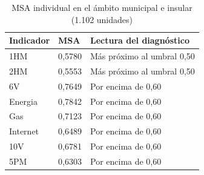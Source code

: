 \begin{table}[htbp]
\centering\small
\caption{MSA individual en el ámbito municipal e insular (1.102 unidades)}\label{tab:msa_actual}
\begin{tabular}{@{}p{}p{}p{}@{}}
\toprule
Indicador & MSA & Lectura del diagnóstico \\
\midrule
1HM & 0,5780 & Más próximo al umbral 0,50 \\
2HM & 0,5553 & Más próximo al umbral 0,50 \\
6V & 0,7649 & Por encima de 0,60 \\
Energia & 0,7842 & Por encima de 0,60 \\
Gas & 0,7123 & Por encima de 0,60 \\
Internet & 0,6489 & Por encima de 0,60 \\
10V & 0,6781 & Por encima de 0,60 \\
5PM & 0,6303 & Por encima de 0,60 \\
\bottomrule
\end{tabular}
\end{table}
